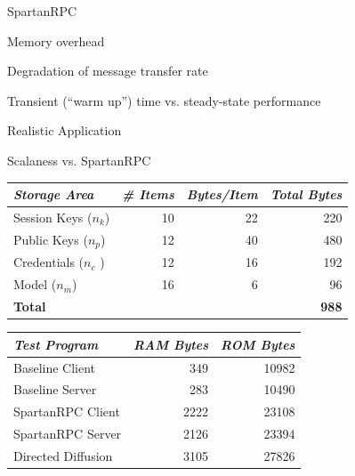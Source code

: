 
\begin{citemize}

\item SpartanRPC
\begin{citemize}
\item Memory overhead
\item Degradation of message transfer rate
\item Transient (``warm up'') time vs. steady-state performance
\end{citemize}

\item Realistic Application
\begin{citemize}
\item Scalaness vs. SpartanRPC
\end{citemize}

\end{citemize}
\stopslide


\centering
  \begin{tabular}{|l|r|r|r|} \hline
    \textit{Storage Area} \T & \textit{\# Items} & \textit{Bytes/Item} & \textit{Total Bytes} \\
    \hline \hline

    Session Keys ($n_k$) \T & 10 & 22 & 220 \\ \hline 
    Public Keys ($n_p$)  \T & 12 & 40 & 480 \\ \hline
    Credentials ($n_c$ ) \T & 12 & 16 & 192 \\ \hline
    Model ($n_m$)        \T & 16 &  6 &  96 \\ \hline \hline
    \textbf{Total} \T & \multicolumn{3}{r|}{ \textbf{988} } \\ \hline
  \end{tabular}
\stopslide


\centering
  \begin{tabular}{|l|r|r|} \hline
    \textit{Test Program} \T & \textit{RAM Bytes} & \textit{ROM Bytes} \\
    \hline \hline

    Baseline Client    \T &  349 & 10982 \\ \hline 
    Baseline Server    \T &  283 & 10490 \\ \hline
    SpartanRPC Client  \T & 2222 & 23108 \\ \hline
    SpartanRPC Server  \T & 2126 & 23394 \\ \hline
    Directed Diffusion \T & 3105 & 27826 \\ \hline
  \end{tabular}
\stopslide

